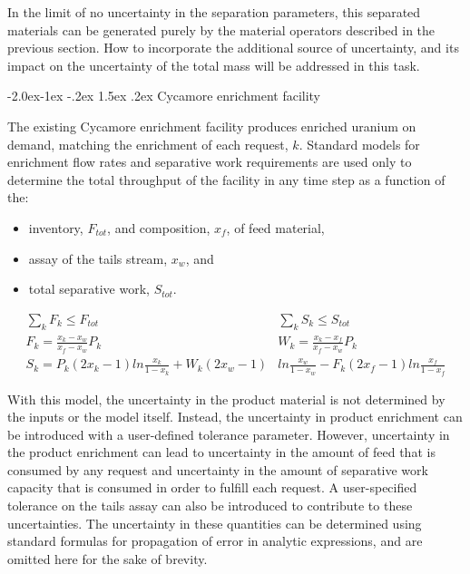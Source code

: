 \documentclass[dvips,12pt]{article}
\makeatletter
\renewcommand\subsubsection{\@startsection{subsubsection}{3}{\z@}%
                                     {-2.0ex\@plus -1ex \@minus -.2ex}%
                                     {1.5ex \@plus .2ex}%
                                     {\normalfont\bfseries}}%
\makeatother
\begin{document}
In the limit of no uncertainty in the separation
parameters, this separated materials can be
generated purely by the material operators
described in the previous section.  How to
incorporate the additional source of uncertainty,
and its impact on the uncertainty of the total
mass will be addressed in this task.

\subsubsection{Cycamore enrichment facility}

The existing Cycamore enrichment facility produces
enriched uranium on demand, matching the
enrichment of each request, $k$.  Standard models
for enrichment flow rates and separative work
requirements are used only to determine the total
throughput of the facility in any time step as a
function of the:
\begin{itemize}[nosep]
\item inventory, $F_{tot}$, and composition,
  $x_f$, of feed material,
\item assay of the tails stream, $x_w$, and
\item total separative work, $S_{tot}$.
\end{itemize}
\begin{align*}
  \sum_k{F_k} \leq F_{tot}\qquad\qquad
  &\sum_k{S_k} \leq S_{tot}\\
  F_k = \frac{x_k - x_w}{x_f - x_w} P_k\qquad\qquad\qquad
  &W_k = \frac{x_k - x_f}{x_f - x_w} P_k\\
  S_k =  P_k\left(2x_k-1\right)ln\frac{x_k}{1-x_k}
         +W_k\left(2x_w-1\right)&ln\frac{x_w}{1-x_w}  
         -F_k\left(2x_f-1\right)ln\frac{x_f}{1-x_f}
\end{align*}

With this model, the uncertainty in the product
material is not determined by the inputs or the
model itself.  Instead, the uncertainty in product
enrichment can be introduced with a user-defined
tolerance parameter.  However, uncertainty in
the product enrichment can lead to uncertainty in
the amount of feed that is consumed by any request
and uncertainty in the amount of separative work
capacity that is consumed in order to fulfill each
request.  A user-specified tolerance on the tails
assay can also be introduced to contribute to
these uncertainties.  The uncertainty in these 
quantities can be determined using standard
formulas for propagation of error in analytic
expressions, and are omitted here for the sake of 
brevity.
\end{document}
